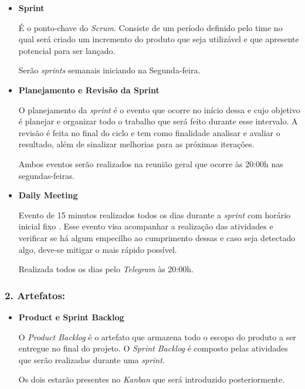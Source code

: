 \begin{itemize}
    \item \textbf{Sprint}
    
    É o ponto-chave do \textit{Scrum}. Consiste de um período definido pelo time no qual será criado um incremento do produto que seja utilizável e que apresente potencial para ser lançado. \cite{THESCRUMGUIDE_2018}
    
    Serão \textit{sprints} semanais iniciando na Segunda-feira.
    
    \item \textbf{Planejamento e Revisão da Sprint}
    
    O planejamento da \textit{sprint} é o evento que ocorre no início dessa e cujo objetivo é planejar e organizar todo o trabalho que será feito durante esse intervalo.
    A revisão é feita no final do ciclo e tem como finalidade analisar e avaliar o resultado, além de sinalizar melhorias para as próximas iterações.

    Ambos eventos serão realizados na reunião geral que ocorre às 20:00h nas segundas-feiras.
    
    \newpage
    
    \item \textbf{Daily Meeting}
    
    Evento de 15 minutos realizados todos os dias  durante a \textit{sprint} com horário inicial fixo \cite{THESCRUMGUIDE_2018}. Esse evento visa acompanhar a realização das atividades e verificar se há algum empecilho ao cumprimento dessas e caso seja detectado algo, deve-se mitigar o mais rápido possível.

    Realizada todos os dias pelo \textit{Telegram} às 20:00h.
\end{itemize}

\subsubsection*{2. Artefatos:}
\begin{itemize}
    \item \textbf{Product e Sprint Backlog}
    
    O \textit{Product Backlog} é o artefato que armazena todo o escopo do produto a ser entregue no final do projeto. O \textit{Sprint Backlog} é composto pelas atividades que serão realizadas durante uma \textit{sprint}.

    Os dois estarão presentes no \textit{Kanban} que será introduzido posteriormente.
\end{itemize}

